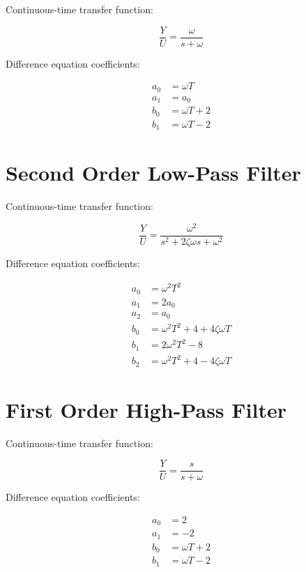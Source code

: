 \documentclass{article}
\begin{document}
Continuous-time transfer function:

\begin{equation}
\frac{Y}{U} = \frac{\omega}{s + \omega}
\end{equation}

Difference equation coefficients:

\begin{align*}
a_0 &= \omega T \\
a_1 &= a_0 \\
b_0 &= \omega T + 2 \\
b_1 &= \omega T - 2
\end{align*}

\section{Second Order Low-Pass Filter}

Continuous-time transfer function:

\begin{equation}
\frac{Y}{U} = \frac{\omega^2}{s^2 + 2 \zeta \omega s + \omega^2}
\end{equation}

Difference equation coefficients:

\begin{align*}
a_0 &= \omega^2 T^2 \\
a_1 &= 2 a_0 \\
a_2 &= a_0 \\
b_0 &= \omega^2 T^2 + 4 + 4 \zeta \omega T \\
b_1 &= 2 \omega^2 T^2 - 8 \\
b_2 &= \omega^2 T^2 + 4 - 4 \zeta \omega T
\end{align*}

\section{First Order High-Pass Filter}

Continuous-time transfer function:

\begin{equation}
\frac{Y}{U} = \frac{s}{s + \omega}
\end{equation}

Difference equation coefficients:

\begin{align*}
a_0 &= 2 \\
a_1 &= -2 \\
b_0 &= \omega T + 2 \\
b_1 &= \omega T - 2
\end{align*}
\end{document}
